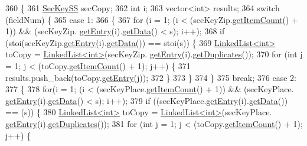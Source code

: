 \begin{DoxyCode}
360                                                        \{
361     \hyperlink{classSecKeySS}{SecKeySS} secCopy;
362     \textcolor{keywordtype}{int} i;
363     vector<int> results;
364     \textcolor{keywordflow}{switch} (fieldNum) \{
365     \textcolor{keywordflow}{case} 1:
366     \{
367         \textcolor{keywordflow}{for} (i = 1; (i < (secKeyZip.\hyperlink{classLinkedList_afc6635f854f48f2f126cf3b60d845220}{getItemCount}() + 1)) && (secKeyZip.
      \hyperlink{classLinkedList_a341bfd7772c9d24d29eb7a7f3936915b}{getEntry}(i).\hyperlink{classSecKeySS_add52510d280d0ca89b653386500f08f5}{getData}() < s); i++);
368         \textcolor{keywordflow}{if} (stoi(secKeyZip.\hyperlink{classLinkedList_a341bfd7772c9d24d29eb7a7f3936915b}{getEntry}(i).\hyperlink{classSecKeySS_add52510d280d0ca89b653386500f08f5}{getData}()) == stoi(s)) \{
369             \hyperlink{classLinkedList}{LinkedList<int>} toCopy = \hyperlink{classLinkedList}{LinkedList<int>}(secKeyZip.
      \hyperlink{classLinkedList_a341bfd7772c9d24d29eb7a7f3936915b}{getEntry}(i).\hyperlink{classSecKeySS_aaae9db891cfcdc3f78d8a44145f4f08c}{getDuplicates}());
370             \textcolor{keywordflow}{for} (\textcolor{keywordtype}{int} j = 1; j < (toCopy.\hyperlink{classLinkedList_afc6635f854f48f2f126cf3b60d845220}{getItemCount}() + 1); j++) \{
371                 results.push\_back(toCopy.\hyperlink{classLinkedList_a341bfd7772c9d24d29eb7a7f3936915b}{getEntry}(j));
372             \}
373         \}
374     \}
375     \textcolor{keywordflow}{break};
376     \textcolor{keywordflow}{case} 2:
377     \{
378         \textcolor{keywordflow}{for}(i = 1; (i < (secKeyPlace.\hyperlink{classLinkedList_afc6635f854f48f2f126cf3b60d845220}{getItemCount}() + 1)) && (secKeyPlace.
      \hyperlink{classLinkedList_a341bfd7772c9d24d29eb7a7f3936915b}{getEntry}(i).\hyperlink{classSecKeySS_add52510d280d0ca89b653386500f08f5}{getData}() < s); i++);
379         \textcolor{keywordflow}{if} ((secKeyPlace.\hyperlink{classLinkedList_a341bfd7772c9d24d29eb7a7f3936915b}{getEntry}(i).\hyperlink{classSecKeySS_add52510d280d0ca89b653386500f08f5}{getData}()) == (s)) \{
380             \hyperlink{classLinkedList}{LinkedList<int>} toCopy = \hyperlink{classLinkedList}{LinkedList<int>}(secKeyPlace.
      \hyperlink{classLinkedList_a341bfd7772c9d24d29eb7a7f3936915b}{getEntry}(i).\hyperlink{classSecKeySS_aaae9db891cfcdc3f78d8a44145f4f08c}{getDuplicates}());
381             \textcolor{keywordflow}{for} (\textcolor{keywordtype}{int} j = 1; j < (toCopy.\hyperlink{classLinkedList_afc6635f854f48f2f126cf3b60d845220}{getItemCount}() + 1); j++) \{

\end{DoxyCode}
